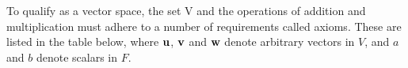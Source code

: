\begin{definition}[Vektorräume]
	
	To qualify as a vector space, the set V and the operations of addition and multiplication must adhere to a number of requirements called axioms. These are listed in the table below, where $\mathbf{u}$, $\mathbf{v}$ and $\mathbf{w}$ denote arbitrary vectors in $V$, and $a$ and $b$ denote scalars in $F$.
\end{definition}